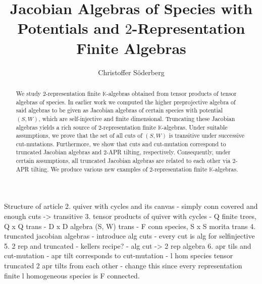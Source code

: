 \documentclass[a4paper, reqno]{amsart}
\title[Jacobian Algebras of Species with Potentials and $2$-Representation Finite Algebras]{Jacobian Algebras of Species with Potentials and $2$-Representation Finite Algebras}
\author{Christoffer S\"oderberg}
\theoremstyle{definition}
\newcommand{\K}{\mathbb{K}}
\begin{document}
\begin{abstract}
	We study $2$-representation finite $\K$-algebras obtained from tensor products of tensor algebras of species. In earlier work \cite{soderberg2024mutation} we computed the higher preprojective algebra of said algebras to be given as Jacobian algebras of certain species with potential $(S, W)$, which are self-injective and finite dimensional. Truncating these Jacobian algebras yields a rich source of $2$-representation finite $\K$-algebras. Under suitable assumptions, we prove that the set of all cuts of $(S, W)$ is transitive under successive cut-mutations. Furthermore, we show that cuts and cut-mutation correspond to truncated Jacobian algebras and $2$-APR tilting, respectively. Consequently, under certain assumptions, all truncated Jacobian algebras are related to each other via $2$-APR tilting. We produce various new examples of $2$-representation finite $\K$-algebras.
\end{abstract}

\maketitle
\tableofcontents

\iffalse
Structure of article
2. quiver with cycles and its canvas
- simply conn covered and enough cuts -> transitive
3. tensor products of quiver with cycles
- Q finite trees, Q x Q trans
- D x D algebra (S, W) trans
- F conn species, S x S morita trans
4. truncated jacobian algebras
- introduce alg cuts
- every cut is alg for selfinjective
5. 2 rep and truncated
- kellers recipe?
- alg cut -> 2 rep algebra
6. apr tils and cut-mutation
- apr tilt corresponds to cut-mutation
- l hom species tensor truncated 2 apr tilts from each other
	- change this since every representation finite l homogeneous species is F connected.
\end{document}
